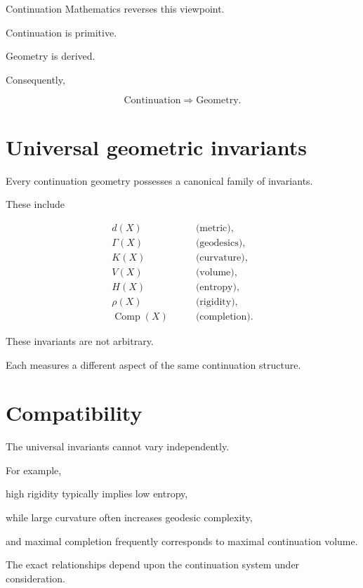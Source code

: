 \documentclass[13pt,openany]{book}
\theoremstyle{plain}
\theoremstyle{definition}
\begin{document}
Continuation Mathematics reverses this viewpoint.

Continuation is primitive.

Geometry is derived.

Consequently,

\[
\boxed{
\text{Continuation}
\Longrightarrow
\text{Geometry}.
}
\]


\section{Universal geometric invariants}

Every continuation geometry possesses a canonical family of invariants.

These include

\[
\begin{aligned}
d(X)
&\qquad
\text{(metric)},\\
\Gamma(X)
&\qquad
\text{(geodesics)},\\
K(X)
&\qquad
\text{(curvature)},\\
V(X)
&\qquad
\text{(volume)},\\
H(X)
&\qquad
\text{(entropy)},\\
\rho(X)
&\qquad
\text{(rigidity)},\\
\operatorname{Comp}(X)
&\qquad
\text{(completion)}.
\end{aligned}
\]

These invariants are not arbitrary.

Each measures a different aspect of the same continuation structure.


\section{Compatibility}

The universal invariants cannot vary independently.

For example,

high rigidity typically implies low entropy,

while large curvature often increases geodesic complexity,

and maximal completion frequently corresponds to maximal continuation volume.

The exact relationships depend upon the continuation system under consideration.
\end{document}

